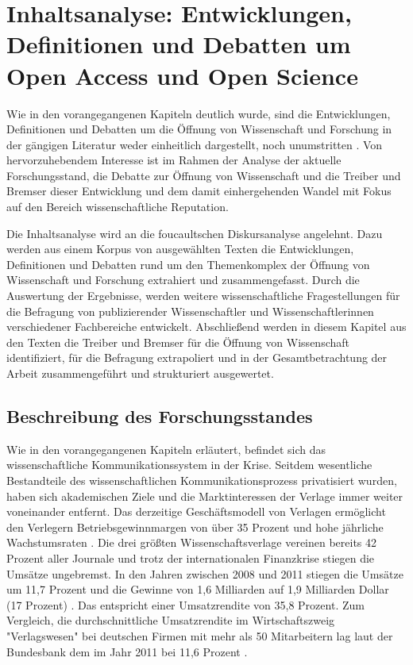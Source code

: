\chapter{Inhaltsanalyse: Entwicklungen, Definitionen und Debatten um Open Access und Open Science}
Wie in den vorangegangenen Kapiteln deutlich wurde, sind die Entwicklungen, Definitionen und Debatten um die Öffnung von Wissenschaft und Forschung in der gängigen Literatur weder einheitlich dargestellt, noch unumstritten \cite{muller_2010_open} \cite{schulze_2013_open}. Von hervorzuhebendem Interesse ist im Rahmen der Analyse der aktuelle Forschungsstand, die Debatte zur Öffnung von Wissenschaft und die Treiber und Bremser dieser Entwicklung und dem damit einhergehenden Wandel mit Fokus auf den Bereich wissenschaftliche Reputation.

Die Inhaltsanalyse wird an die foucaultschen Diskursanalyse angelehnt. Dazu werden aus einem Korpus von ausgewählten Texten die Entwicklungen, Definitionen und Debatten rund um den Themenkomplex der Öffnung von Wissenschaft und Forschung extrahiert und zusammengefasst. Durch die Auswertung der Ergebnisse, werden weitere wissenschaftliche Fragestellungen für die Befragung von publizierender Wissenschaftler und Wissenschaftlerinnen verschiedener Fachbereiche entwickelt. Abschließend werden in diesem Kapitel aus den Texten die Treiber und Bremser für die Öffnung von Wissenschaft identifiziert, für die Befragung extrapoliert und in der Gesamtbetrachtung der Arbeit zusammengeführt und strukturiert ausgewertet.

\section{Beschreibung des Forschungsstandes}
Wie in den vorangegangenen Kapiteln erläutert, befindet sich das wissenschaftliche Kommunikationssystem in der Krise. Seitdem wesentliche Bestandteile des wissenschaftlichen Kommunikationsprozess privatisiert wurden, haben sich akademischen Ziele und die Marktinteressen der Verlage immer weiter voneinander entfernt. Das derzeitige Geschäftsmodell von Verlagen ermöglicht den Verlegern Betriebsgewinnmargen von über 35 Prozent \cite{russell_2008_business} \cite{cope2014future} und hohe jährliche Wachstumsraten \cite{Wellcome_Trust_2003}. Die drei größten Wissenschaftsverlage vereinen bereits 42 Prozent aller Journale und trotz der internationalen Finanzkrise stiegen die Umsätze ungebremst. In den Jahren zwischen 2008 und 2011 stiegen die Umsätze um 11,7 Prozent und die Gewinne von 1,6 Milliarden auf 1,9 Milliarden Dollar (17 Prozent) \cite{cope2014future}. Das entspricht einer Umsatzrendite von 35,8 Prozent. Zum Vergleich, die durchschnittliche Umsatzrendite im Wirtschaftszweig "Verlagswesen" bei deutschen Firmen mit mehr als 50 Mitarbeitern lag laut der Bundesbank dem im Jahr 2011 bei 11,6 Prozent \cite{bundesbank_2014}.

